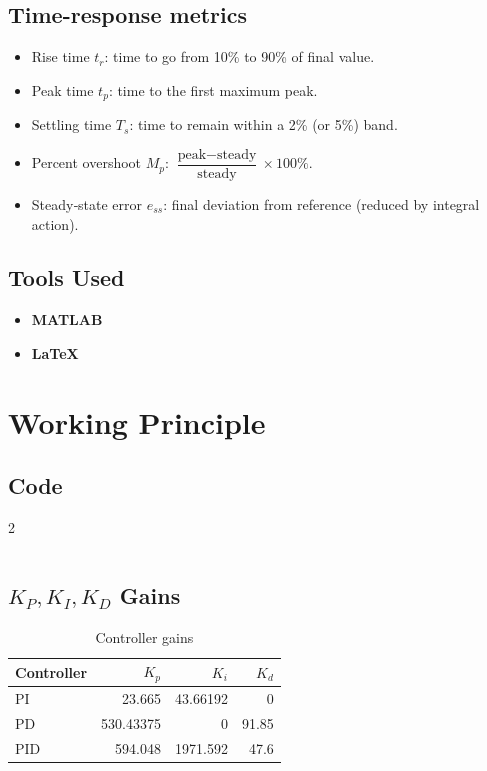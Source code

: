 \documentclass[12pt]{article}
\begin{document}
\subsection*{Time-response metrics}
\begin{itemize}
  \item Rise time $t_r$: time to go from 10\% to 90\% of final value.
  \item Peak time $t_p$: time to the first maximum peak.
  \item Settling time $T_s$: time to remain within a 2\% (or 5\%) band.
  \item Percent overshoot $M_p$: $\dfrac{\text{peak}-\text{steady}}{\text{steady}}\times100\%$.
  \item Steady‑state error $e_{ss}$: final deviation from reference (reduced by integral action).
\end{itemize}


\subsection*{Tools Used}
\begin{itemize}
  \item \textbf{MATLAB}
  \item \textbf{\LaTeX}
\end{itemize}

\section*{Working Principle}

\subsection*{Code}
\begin{multicols}{2}
  \inputminted[fontsize=\small, linenos, breaklines]{matlab}{assets/lr5.m}
\end{multicols}

\subsection*{$K_P, K_I, K_D$ Gains}
\begin{table}[H]
  \centering

  \label{tab:controller_gains}
  \begin{tabular}{l r r r}
    \hline
    Controller & $K_p$     & $K_i$    & $K_d$ \\
    \hline
    PI         & 23.665    & 43.66192 & 0     \\
    PD         & 530.43375 & 0        & 91.85 \\
    PID        & 594.048   & 1971.592 & 47.6  \\
    \hline
  \end{tabular}
  \caption{Controller gains}
\end{table}
\end{document}
